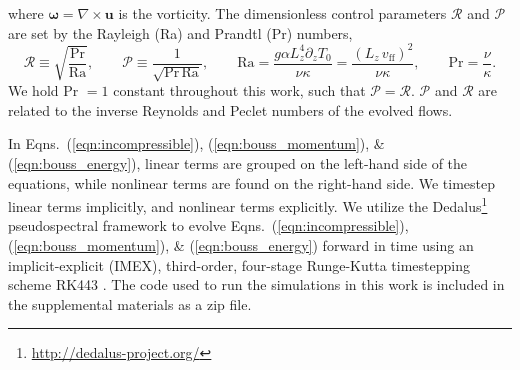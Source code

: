 \documentclass[aps, pre, onecolumn, nofootinbib, notitlepage, groupedaddress, amsfonts, amssymb, amsmath, longbibliography]{revtex4-1}
\newcommand{\grad}{\ensuremath{\nabla}}
\begin{document}
where $\bm{\omega} = \grad \times \bm{u}$ is the vorticity.
The dimensionless control parameters $\mathcal{R}$ and $\mathcal{P}$ 
are set by the Rayleigh (Ra) and Prandtl (Pr) numbers,
\begin{equation}
\mathcal{R} \equiv \sqrt{\frac{\text{Pr}}{\text{Ra}}}, \qquad \mathcal{P} \equiv \frac{1}{\sqrt{\text{Pr}\,\text{Ra}}}, \qquad
\text{Ra} = \frac{g \alpha L_z^4 \partial_z T_0}{\nu\kappa} = \frac{(L_z\,v_{\text{ff}})^2}{\nu\kappa}, \qquad \text{Pr} = \frac{\nu}{\kappa}.
\end{equation}
We hold Pr $= 1$ constant throughout this work, such that $\mathcal{P} = \mathcal{R}$.
$\mathcal{P}$ and $\mathcal{R}$ are related to the inverse Reynolds and Peclet numbers of the
evolved flows.

In Eqns.~(\ref{eqn:incompressible}), (\ref{eqn:bouss_momentum}), \& (\ref{eqn:bouss_energy}),
linear terms are grouped on the left-hand side of the equations, while nonlinear terms
are found on the right-hand side. We timestep linear terms implicitly, and nonlinear
terms explicitly.
We utilize the 
Dedalus\footnote{\url{http://dedalus-project.org/}} 
pseudospectral framework \cite{burns&all2016} to evolve  
Eqns.~(\ref{eqn:incompressible}), (\ref{eqn:bouss_momentum}), \& (\ref{eqn:bouss_energy}) 
forward in time
using an implicit-explicit (IMEX), third-order, four-stage 
Runge-Kutta timestepping scheme RK443 \cite{ascher&all1997}. The code used to run the simulations
in this work is included in the supplemental materials as a zip file.
\end{document}
